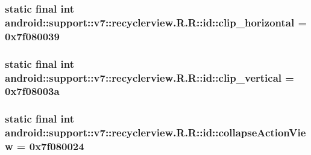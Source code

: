 \hypertarget{classandroid_1_1support_1_1v7_1_1recyclerview_1_1_r_1_1id_de974f53b19374a64b88f8983dd5cf25}{
\subsubsection[{clip\_\-horizontal}]{\setlength{\rightskip}{0pt plus 5cm}static final int android::support::v7::recyclerview.R.R::id::clip\_\-horizontal = 0x7f080039}}
\label{classandroid_1_1support_1_1v7_1_1recyclerview_1_1_r_1_1id_de974f53b19374a64b88f8983dd5cf25}


\hypertarget{classandroid_1_1support_1_1v7_1_1recyclerview_1_1_r_1_1id_b23d9bb4b5dab97f85196dd957c78de0}{
\subsubsection[{clip\_\-vertical}]{\setlength{\rightskip}{0pt plus 5cm}static final int android::support::v7::recyclerview.R.R::id::clip\_\-vertical = 0x7f08003a}}
\label{classandroid_1_1support_1_1v7_1_1recyclerview_1_1_r_1_1id_b23d9bb4b5dab97f85196dd957c78de0}


\hypertarget{classandroid_1_1support_1_1v7_1_1recyclerview_1_1_r_1_1id_2b5aa38967305068f2e5f366f6b7184c}{
\subsubsection[{collapseActionView}]{\setlength{\rightskip}{0pt plus 5cm}static final int android::support::v7::recyclerview.R.R::id::collapseActionView = 0x7f080024}}
\label{classandroid_1_1support_1_1v7_1_1recyclerview_1_1_r_1_1id_2b5aa38967305068f2e5f366f6b7184c}


